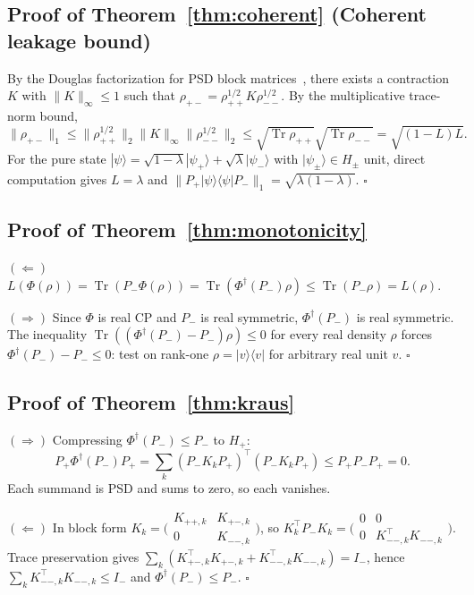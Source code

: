 \documentclass[a4paper,onecolumn,noarxiv]{quantumarticle}
\theoremstyle{plain}
\theoremstyle{definition}
\theoremstyle{remark}
\newcommand{\Pplus}{P_{+}}
\newcommand{\Pminus}{P_{-}}
\newcommand{\Hplus}{H_{+}}
\newcommand{\Tr}{\operatorname{Tr}}
\newcommand{\Phid}{\Phi^{\dagger}}
\newcommand{\Lleak}{L}
\begin{document}
\subsection*{Proof of Theorem~\ref{thm:coherent} (Coherent leakage bound)}

By the Douglas factorization for PSD block matrices~\cite{Bhatia1997}, there exists a
contraction $K$ with $\|K\|_\infty\le 1$ such that $\rho_{+-}=\rho_{++}^{1/2}K\rho_{--}^{1/2}$.
By the multiplicative trace-norm bound,
\[
  \|\rho_{+-}\|_1 \le \|\rho_{++}^{1/2}\|_2\|K\|_\infty\|\rho_{--}^{1/2}\|_2
  \le \sqrt{\Tr\rho_{++}}\sqrt{\Tr\rho_{--}} = \sqrt{(1-\Lleak)\Lleak}.
\]
For the pure state $|\psi\rangle=\sqrt{1-\lambda}|\psi_+\rangle+\sqrt{\lambda}|\psi_-\rangle$
with $|\psi_\pm\rangle\in H_\pm$ unit, direct computation gives $\Lleak=\lambda$ and
$\|\Pplus|\psi\rangle\langle\psi|\Pminus\|_1=\sqrt{\lambda(1-\lambda)}$. \hfill$\square$

\subsection*{Proof of Theorem~\ref{thm:monotonicity}}

$(\Leftarrow)$\; $\Lleak(\Phi(\rho))=\Tr(\Pminus\Phi(\rho))=\Tr(\Phid(\Pminus)\rho)
\le\Tr(\Pminus\rho)=\Lleak(\rho)$.

$(\Rightarrow)$\; Since $\Phi$ is real CP and $\Pminus$ is real symmetric, $\Phid(\Pminus)$
is real symmetric. The inequality $\Tr((\Phid(\Pminus)-\Pminus)\rho)\le 0$ for every
real density $\rho$ forces $\Phid(\Pminus)-\Pminus\le 0$: test on rank-one
$\rho=|v\rangle\langle v|$ for arbitrary real unit $v$. \hfill$\square$

\subsection*{Proof of Theorem~\ref{thm:kraus}}

$(\Rightarrow)$\; Compressing $\Phid(\Pminus)\le\Pminus$ to $\Hplus$:
\[
  \Pplus\Phid(\Pminus)\Pplus
  = \sum_k(\Pminus K_k\Pplus)^\top(\Pminus K_k\Pplus) \le \Pplus\Pminus\Pplus = 0.
\]
Each summand is PSD and sums to zero, so each vanishes.

$(\Leftarrow)$\; In block form $K_k=\bigl(\begin{smallmatrix}K_{++,k}&K_{+-,k}\\0&K_{--,k}\end{smallmatrix}\bigr)$,
so $K_k^\top\Pminus K_k=\bigl(\begin{smallmatrix}0&0\\0&K_{--,k}^\top K_{--,k}\end{smallmatrix}\bigr)$.
Trace preservation gives $\sum_k(K_{+-,k}^\top K_{+-,k}+K_{--,k}^\top K_{--,k})=I_-$,
hence $\sum_k K_{--,k}^\top K_{--,k}\le I_-$ and $\Phid(\Pminus)\le\Pminus$.
\hfill$\square$
\end{document}
